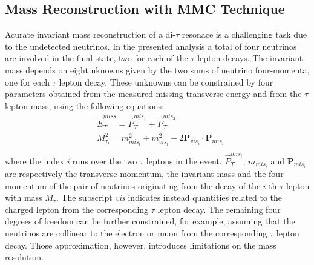 \subsection{Mass Reconstruction with MMC Technique}\label{sec:mmc}

Acurate invariant mass reconstruction of a di-$\tau$ resonace is a challenging task due to the undetected neutrinos. 
In the presented analysis a total of four neutrinos are involved in the final state, two for each 
of the $\tau$ lepton decays.
The invariant mass depends on eight uknowns given by the two
sums of neutrino four-momenta, one for each $\tau$ lepton decay. These unknowns can be constrained by four parameters 
obtained from the measured  missing transverse energy and from the $\tau$ lepton mass, using the following equations:
% 
\begin{equation} \label{eq:MMC}
\begin{split}
&\vec{E}_T^{miss} = \vec{P}_{T}^{mis_{1}} +  \vec{P}_{T}^{mis_2} \\
&M_{\tau_{i}}^2 = m^2_{mis_{i}} + m^2_{vis_{i}} + 2 \mathbf{P}_{vis_i} \cdot \mathbf{P}_{mis_i} \\
\end{split}
\end{equation}
where the index \emph{i} runs over the two $\tau$ leptons in the event. 
$\vec{P}_{T}^{mis_{i}}$, $m_{mis_{i}}$ and $\mathbf{P}_{mis_{i}}$ are respectively the transverse momentum, the invariant mass and 
the four momentum of the pair of neutrinos originating from the decay of the $i$-th  $\tau$ 
lepton with mass $M_{\tau}$. The subscript \emph{vis} indicates instead 
quantities related to the charged lepton from  the corresponding $\tau$ lepton decay. The remaining four degrees of freedom can be 
further constrained, for example, assuming that the neutrinos are collinear to the electron or muon from the corresponding 
$\tau$ lepton decay. Those approximation, however, introduces limitations on the mass resolution.

